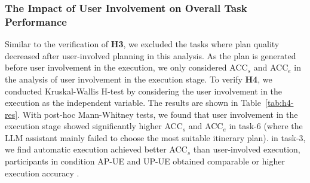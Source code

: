\subsubsection{The Impact of User Involvement on Overall Task Performance} Similar to the verification of \textbf{H3}, we excluded the tasks where plan quality decreased after user-involved planning in this analysis. 
As the plan is generated before user involvement in the execution, we only considered ACC$_s$ and ACC$_e$ in the analysis of user involvement in the execution stage. 
To verify \textbf{H4}, we conducted Kruskal-Wallis H-test by considering the user involvement in the execution as the independent variable. The results are shown in Table~\ref{tab:h4-res}. 
With post-hoc Mann-Whitney tests, we found that user involvement in the execution stage showed significantly higher ACC$_s$ and ACC$_e$ in task-6 (where the LLM assistant mainly failed to choose the most suitable itinerary plan). 
 in task-3,  we find automatic execution achieved  better ACC$_s$ than user-involved execution, participants in condition AP-UE and UP-UE %
obtained comparable or higher execution accuracy . 
